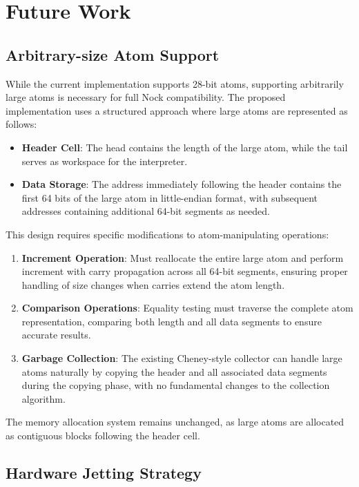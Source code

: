 \documentclass[twoside]{article}
\begin{document}
\section{Future Work}

\subsection{Arbitrary-size Atom Support}

While the current implementation supports 28-bit atoms, supporting arbitrarily large atoms is necessary for full Nock compatibility. The proposed implementation uses a structured approach where large atoms are represented as follows:

\begin{itemize}
  \item \textbf{Header Cell}: The head contains the length of the large atom, while the tail serves as workspace for the interpreter.
  \item \textbf{Data Storage}: The address immediately following the header contains the first 64 bits of the large atom in little-endian format, with subsequent addresses containing additional 64-bit segments as needed.
\end{itemize}

\noindent
This design requires specific modifications to atom-manipu\-lating operations:

\begin{enumerate}
  \item \textbf{Increment Operation}: Must reallocate the entire large atom and perform increment with carry propagation across all 64-bit segments, ensuring proper handling of size changes when carries extend the atom length.
  \item \textbf{Comparison Operations}: Equality testing must traverse the complete atom representation, comparing both length and all data segments to ensure accurate results.
  \item \textbf{Garbage Collection}: The existing Cheney-style collector can handle large atoms naturally by copying the header and all associated data segments during the copying phase, with no fundamental changes to the collection algorithm.
\end{enumerate}

\noindent
The memory allocation system remains unchanged, as large atoms are allocated as contiguous blocks following the header cell.

\subsection{Hardware Jetting Strategy}
\end{document}
